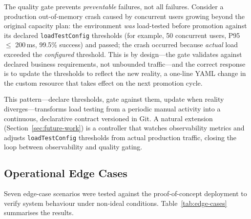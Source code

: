The quality gate prevents \textit{preventable} failures, not all failures. Consider a production out-of-memory crash caused by concurrent users growing beyond the original capacity plan: the environment \textit{was} load-tested before promotion against its declared \texttt{loadTestConfig} thresholds (for example, 50 concurrent users, P95 $\leq$ 200\,ms, 99.5\% success) and passed; the crash occurred because \textit{actual} load exceeded the \textit{configured} threshold. This is by design---the gate validates against declared business requirements, not unbounded traffic---and the correct response is to update the thresholds to reflect the new reality, a one-line YAML change in the custom resource that takes effect on the next promotion cycle.

This pattern---declare thresholds, gate against them, update when reality diverges---transforms load testing from a periodic manual activity into a continuous, declarative contract versioned in Git. A natural extension (Section~\ref{sec:future-work}) is a controller that watches observability metrics and adjusts \texttt{loadTestConfig} thresholds from actual production traffic, closing the loop between observability and quality gating.

\subsection{Operational Edge Cases}
\label{subsec:edge-cases}

Seven edge-case scenarios were tested against the proof-of-concept deployment to verify system behaviour under non-ideal conditions. Table~\ref{tab:edge-cases} summarises the results.

